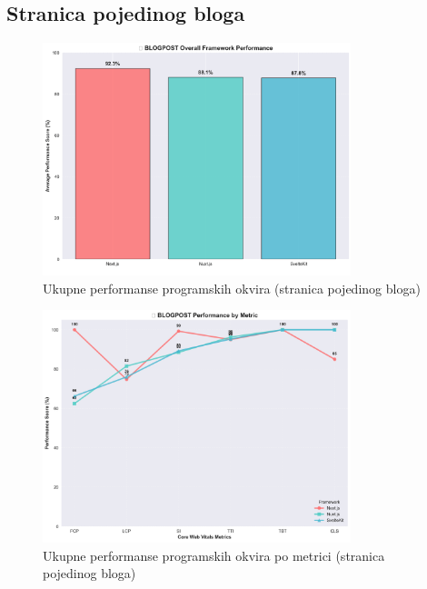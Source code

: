 
\subsection{Stranica pojedinog bloga}

\begin{figure}[H]
    \centering
    \includegraphics[width=0.8\textwidth]{slike/rezultati/blog-post/blogPost_framework_overall_performance.png}
    \caption{Ukupne performanse programskih okvira (stranica pojedinog bloga) }
    \label{fig:testiranje-blog-post-ukupne-performanse}
\end{figure}

\begin{figure}[H]
    \centering
    \includegraphics[width=0.8\textwidth]{slike/rezultati/blog-post/blogPost_performance_by_metric.png}
    \caption{Ukupne performanse programskih okvira po metrici (stranica pojedinog bloga) }
    \label{fig:testiranje-blog-post-performanse-po-metrici}
\end{figure}


